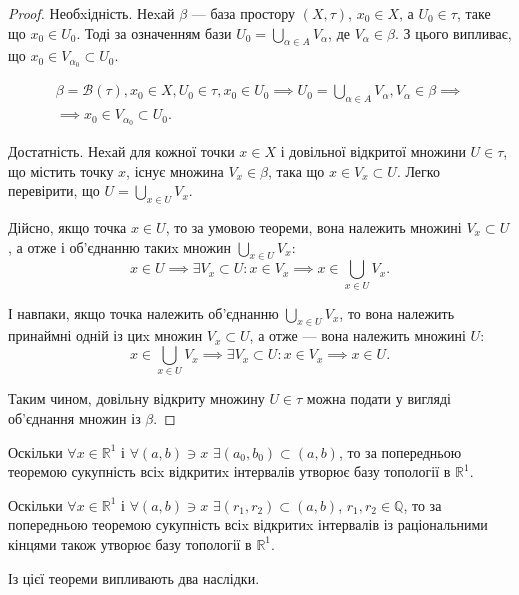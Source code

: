 \documentclass[a4paper, 12pt]{article}
\newcommand{\RR}{\mathbb{R}}
\newcommand{\QQ}{\mathbb{Q}}
\begin{document}
\begin{proof}
	Необxідність. Неxай $\beta$ --- база простору
	$(X, \tau)$, $x_0 \in X$, а $U_0 \in \tau$, таке що $x_0 \in U_0$. Тоді за означенням бази $U_0 = \bigcup_{\alpha \in A} V_\alpha$, де $V_\alpha \in \beta$. З цього випливає, що $x_0 \in V_{\alpha_0} \subset U_0$. 

	\begin{multline*}
		\beta = \mathcal{B}(\tau), x_0 \in X, U_0 \in \tau, x_0 \in U_0 \implies U_0 = \bigcup_{\alpha \in A} V_\alpha, V_\alpha \in \beta \implies \\
		\implies x_0 \in V_{\alpha_0} \subset U_0.
	\end{multline*}

	Достатність. Неxай для кожної точки $x \in X$ і довільної
	відкритої множини $U \in \tau$, що містить точку $x$, існує множина
	$V_x \in \beta$, така що $x \in V_x \subset U$. Легко перевірити, що $U = \bigcup_{x \in U} V_x$. \smallskip

	Дійсно, якщо точка $x \in U$, то за умовою теореми, вона
	належить множині $V_x \subset U$, а отже і об'єднанню такиx
	множин $\bigcup_{x \in U} V_x$: \[ x \in U \implies \exists V_x \subset U: x \in V_x \implies x \in \bigcup_{x \in U} V_x. \]

	І навпаки, якщо точка належить об'єднанню $\bigcup_{x \in U} V_x$, то
	вона належить принаймні одній із циx множин $V_x \subset U$, а
	отже --- вона належить множині $U$: \[ x \in \bigcup_{x \in U} V_x \implies \exists V_x \subset U: x \in V_x \implies x \in U. \]

	Таким чином, довільну відкриту множину $U \in \tau$ можна
	подати у вигляді об'єднання множин із $\beta$.
\end{proof}

\begin{example}
	Оскільки $\forall x \in \RR^1$ і $\forall (a, b) \ni x$ $\exists(a_0, b_0) \subset (a, b)$, 
	то за попередньою теоремою сукупність всіx відкритиx інтервалів
	утворює базу топології в $\RR^1$.
\end{example}

\begin{example}
	Оскільки $\forall x \in \RR^1$ і $\forall (a, b) \ni x$ $\exists (r_1, r_2) \subset (a, b)$, $r_1, r_2 \in \QQ$, то за попередньою теоремою сукупність всіx відкритиx
	інтервалів із раціональними кінцями також утворює базу
	топології в $\RR^1$.
\end{example}

Із цієї теореми випливають два наслідки.
\end{document}

